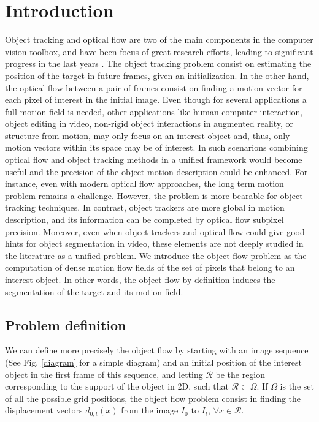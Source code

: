 
\chapter{Introduction} \label{chap:intro}

Object tracking and optical flow are two of the main components in the
computer vision toolbox, and have been focus of great research efforts, 
leading to significant progress in the last years \cite{c16}\cite{c17}. 
The object tracking problem consist on estimating the 
position of the target in future frames, given an initialization. In the
other hand, the optical flow between a pair of frames consist on finding a motion vector 
for each pixel of interest in the initial image. Even though for several
applications a full motion-field is needed, other applications like
human-computer interaction, object editing in video, non-rigid object interactions in augmented reality, or structure-from-motion,
may only focus on an interest object and, thus, only motion vectors within its 
space may be of interest. 
In such scenarions combining optical flow and object tracking methods in a unified 
framework would become useful and the precision of the object motion description 
could be enhanced. For instance, even with modern optical flow approaches, 
the long term motion problem remains a challenge. However, the problem is more 
bearable for object tracking techniques. In contrast, object trackers are more global 
in motion description, and its information can be completed by optical flow subpixel 
precision. Moreover,  even when object
trackers and optical flow could give good hints for object segmentation in video, 
these elements are not deeply studied in the literature as a unified problem.
We introduce the object flow problem as the computation of dense motion 
flow fields of the set of pixels that belong to an interest object. In other words, 
the object flow by definition induces the segmentation of the target and its motion field.

\section{Problem definition}

We can define more precisely the object flow by starting with an image sequence (See Fig. \ref{diagram} for a simple diagram) and an initial 
position of the interest object in the first frame of this sequence, and letting $\mathcal{R}$ 
be the region corresponding to the support of the object in 2D, such that 
$\mathcal{R} \subset \Omega$. If $\Omega$ is the set of all the possible grid positions, 
the object flow problem consist in finding the displacement vectors $d_{0,t}(x)$ from the image $I_{0}$ to $I_{t}$, $\forall x \in \mathcal{R}$.

